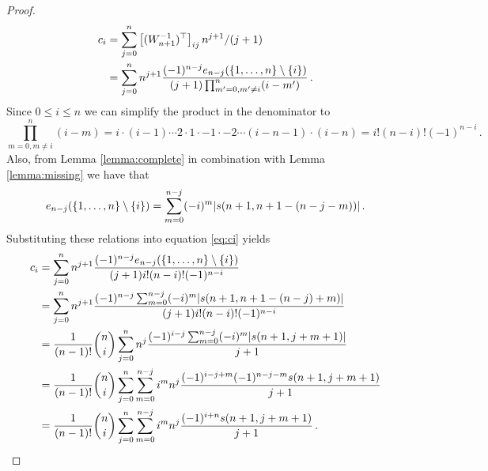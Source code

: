 \begin{proof}
\begin{align}
    c_i &= \sum_{j=0}^{n} \left[(W_{n+1}^{-1})^\top\right]_{ij} n^{j+1}/(j+1) \nonumber \\
        &= \sum_{j=0}^{n} n^{j+1} \frac{(-1)^{n-j} e_{n-j} (\{ 1, \dots, n \} \mathbin{\backslash} \{ i \})}{(j+1) \prod^{n}_{m'=0, m'\neq i} (i - m')} \,. \label{eq:ci}
\end{align}
Since $0 \leq i \leq n$ we can simplify the product in the denominator to
\begin{equation}
    \prod^{n}_{m=0, m\neq i} (i - m) = i \cdot (i-1) \cdots 2 \cdot 1 \cdot -1 \cdot -2 \cdots (i-n-1) \cdot (i-n) = i! (n-i)! (-1)^{n-i} \,. \nonumber
\end{equation}
Also, from Lemma \ref{lemma:complete} in combination with Lemma \ref{lemma:missing} we have that
\begin{equation}
    e_{n-j} (\{ 1, \dots, n \} \mathbin{\backslash} \{ i \}) = \sum_{m=0}^{n-j} (-i)^m |s(n+1, n+1-(n-j-m))| \,. \nonumber
\end{equation}
Substituting these relations into equation \ref{eq:ci} yields
\begin{align}
    c_i &= \sum_{j=0}^{n} n^{j+1} \frac{(-1)^{n-j} e_{n-j} (\{ 1, \dots, n \} \mathbin{\backslash} \{ i \})}{(j+1) i! (n-i)! (-1)^{n-i}} \nonumber \\
        &= \sum_{j=0}^{n} n^{j+1} \frac{(-1)^{n-j} \sum_{m=0}^{n-j} (-i)^m |s(n+1, n+1-(n-j)+m)| }{(j+1) i! (n-i)! (-1)^{n-i}} \nonumber \\
        &= \frac{1}{(n-1)!} \binom{n}{i} \sum_{j=0}^{n} n^{j} \frac{(-1)^{i-j} \sum_{m=0}^{n-j} (-i)^m |s(n+1, j+m+1)| }{j+1} \nonumber \\
        &= \frac{1}{(n-1)!} \binom{n}{i} \sum_{j=0}^{n} \sum_{m=0}^{n-j} i^m  n^{j} \frac{(-1)^{i-j+m} (-1)^{n-j-m} s(n+1, j+m+1) }{j+1} \nonumber \\
        &= \frac{1}{(n-1)!} \binom{n}{i} \sum_{j=0}^{n} \sum_{m=0}^{n-j} i^m n^{j} \frac{(-1)^{i+n} s(n+1, j+m+1) }{j+1} \,. \nonumber
\end{align}

\end{proof}
